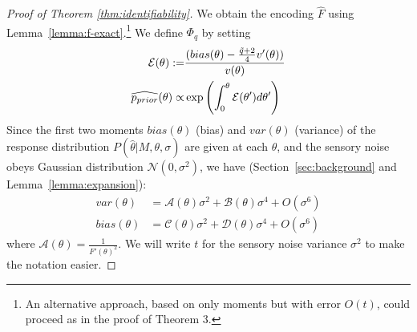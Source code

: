 \begin{proof}[Proof of Theorem \ref{thm:identifiability}]
We obtain the encoding $\widehat{F}$ using Lemma~\ref{lemma:f-exact}.\footnote{An alternative approach, based on only moments but with error $O(t)$, could proceed as in the proof of Theorem 3.}
We define $\Phi_q$ by setting
\begin{align*}
    \mathcal{E}(\theta) := & \frac{(bias(\theta) - \frac{\tilde{q}+2}{4} v'(\theta))}{v(\theta)} \\
    \widehat{p_{prior}}(\theta) \propto & \exp\left( \int_0^\theta \mathcal{E}(\theta') d\theta' \right)
\end{align*}
Since the first two moments $bias(\theta)$ (bias) and $var(\theta)$ (variance) of the response distribution $P(\widehat{\theta}|M,\theta, \sigma)$ are given at each $\theta$, and the sensory noise obeys Gaussian distribution $\mathcal{N}(0, \sigma^2)$, we have (Section~\ref{sec:background} and Lemma~\ref{lemma:expansion}):
\begin{align*}
    var(\theta) &= \mathcal{A}(\theta)\sigma^2 + \mathcal{B}(\theta)\sigma^4 + O(\sigma^6)\\
    bias(\theta) &= \mathcal{C}(\theta)\sigma^2 + \mathcal{D}(\theta)\sigma^4 + O(\sigma^6)
\end{align*}
where $\mathcal{A}(\theta) = \frac{1}{F'(\theta)^2}$. We will write $t$ for the sensory noise variance $\sigma^2$ to make the notation easier.



\end{proof}
